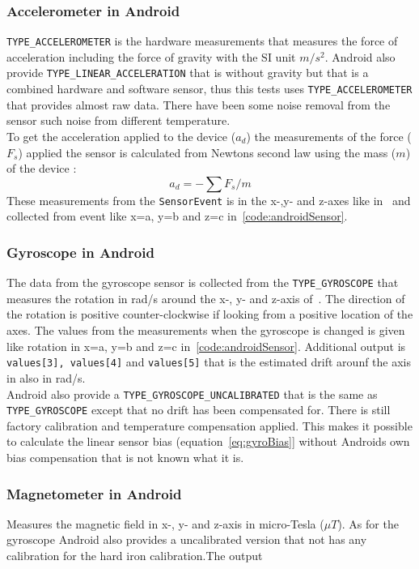 \subsubsection{Accelerometer in Android}
\texttt{TYPE\_ACCELEROMETER} is the hardware measurements that measures the force of acceleration including the force of gravity with the SI unit $m/s^2$. Android also provide \texttt{TYPE\_LINEAR\_ACCELERATION} that is without gravity but that is a combined hardware and software sensor, thus this tests uses  \texttt{TYPE\_ACCELEROMETER} that provides almost raw data. There have been some noise removal from the sensor such noise from different temperature. \\
To get the acceleration applied to the device ($a_d$) the measurements of the force ($F_s$) applied the sensor is calculated from Newtons second law using the mass ($m$) of the device :
$$a_d=-\sum F_s / m $$ 
These measurements from the \texttt{SensorEvent} is in the x-,y- and z-axes like in~ and collected from event like x=a, y=b and z=c in~\ref{code:androidSensor}. \cite[]{android:sensorEvent}


\subsubsection{Gyroscope in Android}
The data from the gyroscope sensor is collected from the \texttt{TYPE\_GYROSCOPE} that measures the rotation in rad/s around the x-, y- and z-axis of~. The direction of the rotation is positive counter-clockwise if looking from a positive location of the axes. The values from the measurements when the gyroscope is changed is given like rotation in x=a, y=b and z=c in~\ref{code:androidSensor}. Additional output is \texttt{values[3], values[4]} and \texttt{values[5]} that is the estimated drift arounf the axis in also in rad/s.\\
Android also provide a \texttt{TYPE\_GYROSCOPE\_UNCALIBRATED} that is the same as \texttt{TYPE\_GYROSCOPE} except that no drift has been compensated for. There is still factory calibration and temperature compensation applied. \cite[]{android:sensorEvent} This makes it possible to calculate the linear sensor bias (equation~\ref{eq:gyroBias}] without Androids own bias compensation that is not known what it is.



\subsubsection{Magnetometer in Android}
Measures the magnetic field in x-, y- and z-axis in micro-Tesla ($\mu T$). As for the gyroscope Android also provides a uncalibrated version that not has any calibration for the hard iron calibration.The output 

